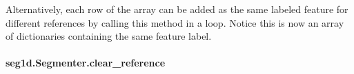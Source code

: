 \documentclass[letterpaper,10pt,english]{sphinxmanual}
\begin{document}
\begin{fulllineitems}
\sphinxAtStartPar
Alternatively, each row of the array can be added as the same labeled
feature for different references by calling this method in a loop.
Notice this is now an array of dictionaries containing the same
feature label.

\begin{sphinxVerbatim}[commandchars=\\\{\}]
  
  
    
\end{sphinxVerbatim}

\end{fulllineitems}



\paragraph{seg1d.Segmenter.clear\_reference}
\label{\detokenize{generated/seg1d.Segmenter.clear_reference:seg1d-segmenter-clear-reference}}\label{\detokenize{generated/seg1d.Segmenter.clear_reference::doc}}
\end{document}
